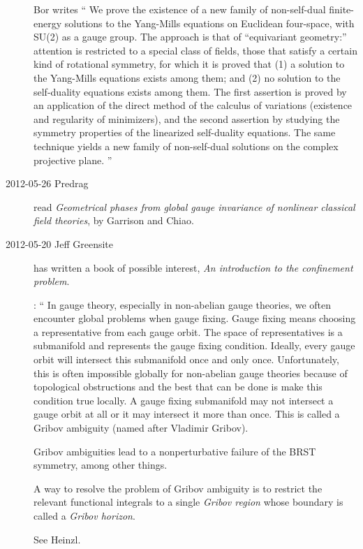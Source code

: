 \begin{description}

Bor writes
``
We prove the existence of a new family of non-self-dual finite-energy
solutions to the Yang-Mills equations on Euclidean four-space, with SU(2)
as a gauge group. The approach is that of ``equivariant geometry:''
attention is restricted to a special class of fields, those that satisfy
a certain kind of rotational symmetry, for which it is proved that (1) a
solution to the Yang-Mills equations exists among them; and (2) no
solution to the self-duality equations exists among them. The first
assertion is proved by an application of the direct method of the
calculus of variations (existence and regularity of minimizers), and the
second assertion by studying the symmetry properties of the linearized
self-duality equations. The same technique yields a new family of
non-self-dual solutions on the complex projective plane.
''

\item[2012-05-26 Predrag] read
{\it Geometrical phases from global gauge invariance of nonlinear classical field theories},
by Garrison and Chiao.

\item[2012-05-20 Jeff Greensite] has written a book of possible interest,
\emph{An introduction to the confinement problem}.

:
``
In gauge theory, especially in non-abelian gauge theories, we often
encounter global problems when gauge fixing. Gauge fixing means choosing
a representative from each gauge orbit. The space of representatives is a
submanifold and represents the gauge fixing condition. Ideally, every
gauge orbit will intersect this submanifold once and only once.
Unfortunately, this is often impossible globally for non-abelian gauge
theories because of topological obstructions and the best that can be
done is make this condition true locally. A gauge fixing submanifold may
not intersect a gauge orbit at all or it may intersect it more than once.
This is called a Gribov ambiguity (named after Vladimir Gribov).

Gribov ambiguities lead to a nonperturbative failure of the BRST
symmetry, among other things.

A way to resolve the problem of Gribov ambiguity is to restrict the
relevant functional integrals to a single \emph{Gribov region} whose
boundary is called a \emph{Gribov horizon}.

See Heinzl.

\end{description}
